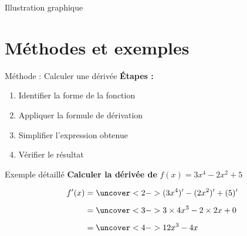 \documentclass[12pt, xcolor={svgnames}]{beamer}
\theoremstyle{definition}
\begin{document}
\begin{frame}{Illustration graphique}
  \begin{center}
  \end{center}
\end{frame}

\section{Méthodes et exemples}

\begin{frame}{Méthode : Calculer une dérivée}
  \textbf{Étapes :}

  \begin{enumerate}
    \item<2-> Identifier la forme de la fonction
    \item<3-> Appliquer la formule de dérivation
    \item<4-> Simplifier l'expression obtenue
    \item<5-> Vérifier le résultat
  \end{enumerate}

  \vspace{1em}

\end{frame}

\begin{frame}{Exemple détaillé}
  \textbf{Calculer la dérivée de} $f(x) = 3x^4 - 2x^2 + 5$

  \vspace{1em}

  \begin{align*}
    f'(x) &= \uncover<2->{(3x^4)' - (2x^2)' + (5)'} \\[0.5em]
          &= \uncover<3->{3 \times 4x^3 - 2 \times 2x + 0} \\[0.5em]
          &= \uncover<4->{12x^3 - 4x}
  \end{align*}

  \vspace{1em}

\end{frame}
\end{document}
